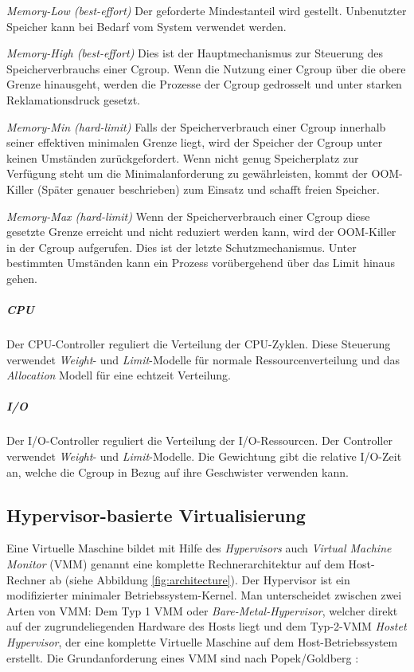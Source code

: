 \emph{Memory-Low (best-effort)}
Der geforderte Mindestanteil wird gestellt. Unbenutzter Speicher kann bei Bedarf vom System verwendet werden.

\emph{Memory-High (best-effort)}
Dies ist der Hauptmechanismus zur Steuerung des Speicherverbrauchs einer Cgroup. Wenn die Nutzung einer Cgroup über die obere Grenze hinausgeht, werden die Prozesse der Cgroup gedrosselt und unter starken Reklamationsdruck gesetzt.

\emph{Memory-Min (hard-limit)}
Falls der Speicherverbrauch einer Cgroup innerhalb seiner effektiven minimalen Grenze liegt, wird der Speicher der Cgroup unter keinen Umständen zurückgefordert. Wenn nicht genug Speicherplatz zur Verfügung steht um die Minimalanforderung zu gewährleisten, kommt der OOM-Killer (Später genauer beschrieben) zum Einsatz und schafft freien Speicher.

\emph{Memory-Max (hard-limit)}
Wenn der Speicherverbrauch einer Cgroup diese gesetzte Grenze erreicht und nicht reduziert werden kann, wird der OOM-Killer in der Cgroup aufgerufen. Dies ist der letzte Schutzmechanismus. Unter bestimmten Umständen kann ein Prozess vorübergehend über das Limit hinaus gehen.

\subparagraph{CPU}
Der CPU-Controller reguliert die Verteilung der CPU-Zyklen. Diese Steuerung verwendet \emph{Weight}- und \emph{Limit}-Modelle für normale Ressourcenverteilung und das \emph{Allocation} Modell für eine echtzeit Verteilung.
\subparagraph{I/O}
Der I/O-Controller reguliert die Verteilung der I/O-Ressourcen. Der Controller verwendet \emph{Weight}- und \emph{Limit}-Modelle. Die Gewichtung gibt die relative I/O-Zeit an, welche die Cgroup in Bezug auf ihre Geschwister verwenden kann.

\pagebreak
\subsection{Hypervisor-basierte Virtualisierung}
Eine Virtuelle Maschine bildet mit Hilfe des \emph{Hypervisors} auch \emph{Virtual Machine Monitor} (VMM) genannt eine komplette Rechnerarchitektur auf dem Host-Rechner ab (siehe Abbildung \ref{fig:architecture}). Der Hypervisor ist ein modifizierter minimaler Betriebssystem-Kernel. Man unterscheidet zwischen zwei Arten von VMM: Dem Typ 1 VMM oder \emph{Bare-Metal-Hypervisor}, welcher direkt auf der zugrundeliegenden Hardware des Hosts liegt und dem Typ-2-VMM \emph{Hostet Hypervisor}, der eine komplette Virtuelle Maschine auf dem Host-Betriebssystem erstellt. Die Grundanforderung eines VMM sind nach Popek/Goldberg \cite{Popek1974FormalArchitectures,Glatz2015Betriebssysteme}:


